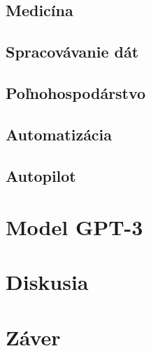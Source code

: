 \documentclass[8pt,twoside,slovak,a4paper]{article}
\begin{document}
\subsection{Medicína}
\subsection{Spracovávanie dát}
\subsection{Poľnohospodárstvo}
\subsection{Automatizácia}
\subsection{Autopilot}

\section{Model GPT-3} \label{gpt}

\section{Diskusia} \label{diskusia}

\section{Záver} \label{zaver} %





%
\end{document}
